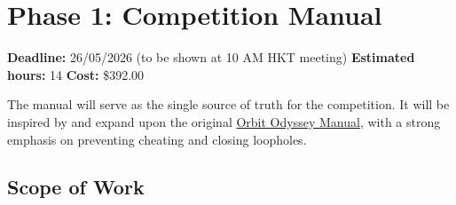 \documentclass[a4paper]{article}
\begin{document}
\section*{Phase 1: Competition Manual}

\noindent\textbf{Deadline:} 26/05/2026 (to be shown at 10 AM HKT meeting) \hfill \textbf{Estimated hours:} 14 \hfill \textbf{Cost:} \$392.00

\vspace{0.5em}

The manual will serve as the single source of truth for the competition. It will be inspired by and expand upon the original \href{https://docs.google.com/document/d/1N_mCX1EM3w5nDMbHrX3vcQlSqa2yJL38nCU0xxMPxmY/edit?tab=t.0}{Orbit Odyssey Manual}, with a strong emphasis on preventing cheating and closing loopholes.

\subsection*{Scope of Work}
\end{document}
